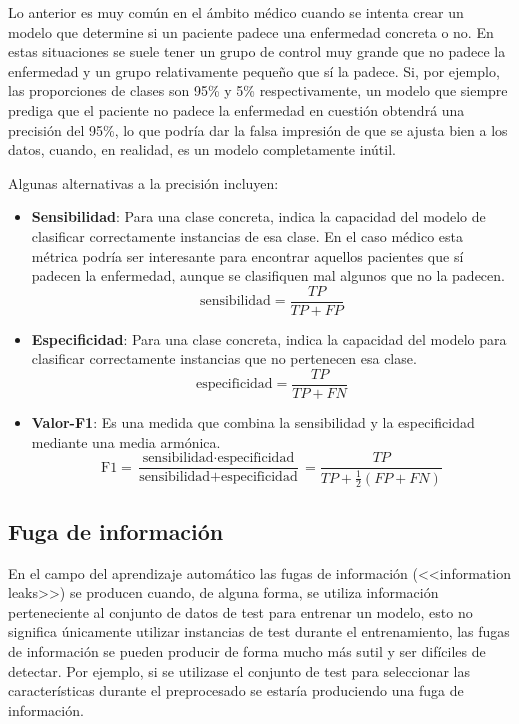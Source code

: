 Lo anterior es muy común en el ámbito médico cuando se intenta crear un modelo
que determine si un paciente padece una enfermedad concreta o no. En estas
situaciones se suele tener un grupo de control muy grande que no padece la
enfermedad y un grupo relativamente pequeño que sí la padece. Si, por ejemplo,
las proporciones de clases son 95\% y 5\% respectivamente, un modelo que siempre
prediga que el paciente no padece la enfermedad en cuestión obtendrá una
precisión del 95\%, lo que podría dar la falsa impresión de que se ajusta bien a
los datos, cuando, en realidad, es un modelo completamente inútil.

Algunas alternativas a la precisión incluyen:

\begin{itemize}
    \item \textbf{Sensibilidad}: Para una clase concreta, indica la capacidad
    del modelo de clasificar correctamente instancias de esa clase. En el caso
    médico esta métrica podría ser interesante para encontrar aquellos pacientes
    que sí padecen la enfermedad, aunque se clasifiquen mal algunos que no la
    padecen.
    $$
    \text{sensibilidad} = \frac{TP}{TP + FP}
    $$
    \item \textbf{Especificidad}: Para una clase concreta, indica la capacidad
    del modelo para clasificar correctamente instancias que no pertenecen esa
    clase.
    $$
    \text{especificidad} = \frac{TP}{TP + FN}
    $$
    \item \textbf{Valor-F1}: Es una medida que combina la sensibilidad y la
    especificidad mediante una media armónica.
    $$
    \text{F1}
    = \frac{\text{sensibilidad}\cdot\text{especificidad}}{\text{sensibilidad} + \text{especificidad}}
    = \frac{TP}{TP + \frac{1}{2}(FP + FN)}
    $$
\end{itemize}

\subsection{Fuga de información}

En el campo del aprendizaje automático las fugas de información (<<information
leaks>>) se producen cuando, de alguna forma, se utiliza información perteneciente
al conjunto de datos de test para entrenar un modelo, esto no significa
únicamente utilizar instancias de test durante el entrenamiento, las fugas de
información se pueden producir de forma mucho más sutil y ser difíciles de
detectar. Por ejemplo, si se utilizase el conjunto de test para seleccionar las
características durante el preprocesado se estaría produciendo una fuga de
información.

